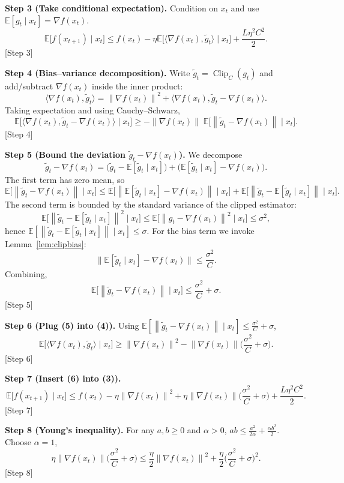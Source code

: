 \documentclass[11pt]{article}
\newcommand{\EE}{\mathbb{E}}
\newcommand{\norm}[1]{\left\lVert#1\right\rVert}
\begin{document}
\noindent\textbf{Step 3 (Take conditional expectation).}  
Condition on $x_t$ and use $\EE[g_t\mid x_t]=\nabla f(x_t)$.
\[
\EE\big[f(x_{t+1})\mid x_t\big]\le f(x_t)-\eta\EE\big[\langle\nabla f(x_t),\tilde g_t\rangle\mid x_t\big]
+\frac{L\eta^2 C^2}{2}.
\tag{3}
\] \hfill[Step 3]

\noindent\textbf{Step 4 (Bias–variance decomposition).}  
Write $\tilde g_t=\operatorname{Clip}_C(g_t)$ and add/subtract $\nabla f(x_t)$ inside the inner product:
\[
\langle\nabla f(x_t),\tilde g_t\rangle
=\norm{\nabla f(x_t)}^2
+\langle\nabla f(x_t),\tilde g_t-\nabla f(x_t)\rangle .
\]
Taking expectation and using Cauchy–Schwarz,
\[
\EE\big[\langle\nabla f(x_t),\tilde g_t-\nabla f(x_t)\rangle\mid x_t\big]
\ge -\norm{\nabla f(x_t)}\;\EE\big[\norm{\tilde g_t-\nabla f(x_t)}\mid x_t\big].
\tag{4}
\] \hfill[Step 4]

\noindent\textbf{Step 5 (Bound the deviation $\tilde g_t-\nabla f(x_t)$).}  
We decompose
\[
\tilde g_t-\nabla f(x_t)
=\big(\tilde g_t-\EE[\tilde g_t\mid x_t]\big)
+\big(\EE[\tilde g_t\mid x_t]-\nabla f(x_t)\big).
\]
The first term has zero mean, so
\[
\EE\big[\norm{\tilde g_t-\nabla f(x_t)}\mid x_t\big]
\le \EE\big[\norm{\EE[\tilde g_t\mid x_t]-\nabla f(x_t)}\mid x_t\big]
+\EE\big[\norm{\tilde g_t-\EE[\tilde g_t\mid x_t]}\mid x_t\big].
\]
The second term is bounded by the standard variance of the clipped estimator:
\[
\EE\big[\norm{\tilde g_t-\EE[\tilde g_t\mid x_t]}^2\mid x_t\big]
\le \EE\big[\norm{g_t-\nabla f(x_t)}^2\mid x_t\big]\le\sigma^2,
\]
hence $\EE[\norm{\tilde g_t-\EE[\tilde g_t\mid x_t]}\mid x_t]\le\sigma$.
For the bias term we invoke Lemma~\ref{lem:clipbias}:
\[
\big\|\EE[\tilde g_t\mid x_t]-\nabla f(x_t)\big\|
\le \frac{\sigma^2}{C}.
\]
Combining,
\[
\EE\big[\norm{\tilde g_t-\nabla f(x_t)}\mid x_t\big]
\le \frac{\sigma^2}{C}+\sigma .
\tag{5}
\] \hfill[Step 5]

\noindent\textbf{Step 6 (Plug (5) into (4)).}  
Using $\EE[\norm{\tilde g_t-\nabla f(x_t)}\mid x_t]\le \frac{\sigma^2}{C}+\sigma$,
\[
\EE\big[\langle\nabla f(x_t),\tilde g_t\rangle\mid x_t\big]
\ge \norm{\nabla f(x_t)}^2
-\norm{\nabla f(x_t)}\Big(\frac{\sigma^2}{C}+\sigma\Big).
\tag{6}
\] \hfill[Step 6]

\noindent\textbf{Step 7 (Insert (6) into (3)).}  
\[
\EE\big[f(x_{t+1})\mid x_t\big]
\le f(x_t)-\eta\norm{\nabla f(x_t)}^2
+\eta\norm{\nabla f(x_t)}\Big(\frac{\sigma^2}{C}+\sigma\Big)
+\frac{L\eta^2 C^2}{2}.
\tag{7}
\] \hfill[Step 7]

\noindent\textbf{Step 8 (Young's inequality).}  
For any $a,b\ge0$ and $\alpha>0$, $ab\le \frac{a^2}{2\alpha}+ \frac{\alpha b^2}{2}$. Choose $\alpha=1$,
\[
\eta\norm{\nabla f(x_t)}\Big(\frac{\sigma^2}{C}+\sigma\Big)
\le \frac{\eta}{2}\norm{\nabla f(x_t)}^2
+\frac{\eta}{2}\Big(\frac{\sigma^2}{C}+\sigma\Big)^2 .
\tag{8}
\] \hfill[Step 8]
\end{document}
